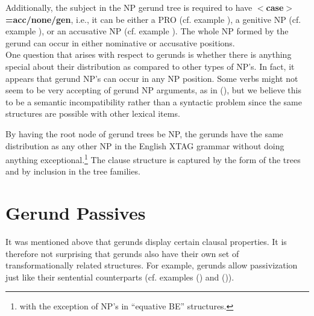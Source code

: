 Additionally, the subject in the NP gerund tree is required to have {\bf
$<$case$>$=acc/none/gen}, i.e., it can be either a PRO (cf. example
), a genitive NP (cf. example ), or an accusative NP
(cf. example ). The whole NP formed by the gerund can occur in either
nominative or accusative positions.\\

One question that arises with respect to gerunds is whether there is anything
special about their distribution as compared to other types of NP's.  In fact,
it appears that gerund NP's can occur in any NP position.  Some verbs might not
seem to be very accepting of gerund NP arguments, as in (), but we
believe this to be a semantic incompatibility rather than a syntactic problem
since the same structures are possible with other lexical items.


By having the root node of gerund trees be NP, the gerunds have the same
distribution as any other NP in the English XTAG grammar without doing
anything exceptional.\footnote{with the exception of NP's in ``equative
BE'' structures.} The clause structure is captured by the form of the trees
and by inclusion in the tree families.\\

\section{Gerund Passives}

It was mentioned above that gerunds display certain clausal properties. It
is therefore not surprising that gerunds also have their own set of
transformationally related structures. For example, gerunds allow
passivization just like their sentential counterparts (cf. examples
() and ()). 


